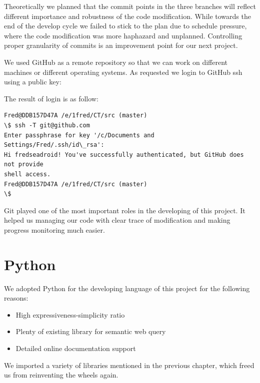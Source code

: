 \documentclass[12pt]{cls}
\begin{document}
Theoretically we planned that the commit points in the three branches will reflect different importance and robustness of the code modification. While towards the end of the develop cycle we failed to stick to the plan due to schedule pressure, where the code modification was more haphazard and unplanned. Controlling proper granularity of commits is an improvement point for our next project.

We used GitHub as a remote repository so that we can work on different machines or different operating systems. As requested we login to GitHub ssh using a public key:


The result of login is as follow:

\begin{verbatim}
Fred@DDB157D47A /e/1fred/CT/src (master)
\$ ssh -T git@github.com
Enter passphrase for key '/c/Documents and Settings/Fred/.ssh/id\_rsa':
Hi fredseadroid! You've successfully authenticated, but GitHub does not provide
shell access.
Fred@DDB157D47A /e/1fred/CT/src (master)
\$
\end{verbatim}

Git played one of the most important roles in the developing of this project. It helped us managing our code with clear trace of modification and making progress monitoring much easier.

\section{Python}

We adopted Python for the developing language of this project for the following reasons:

\begin{itemize}
\item High expressiveness-simplicity ratio
\item Plenty of existing library for semantic web query
\item Detailed online documentation support
\end{itemize}

We imported a variety of libraries mentioned in the previous chapter, which freed us from reinventing the wheels again.
\end{document}
